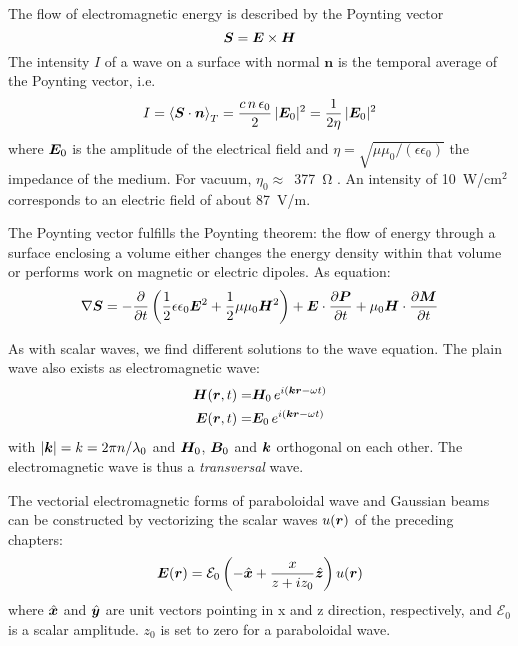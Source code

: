 The flow of electromagnetic energy is described by the Poynting vector
\begin{equation}
    \boldsymbol{S} = \boldsymbol{E} \times \boldsymbol{H}
\end{equation}
The intensity $I$ of a wave on a surface with normal $\boldsymbol{n}$ is the temporal average of the Poynting vector, i.e.
\begin{equation}
    I = \braket{\boldsymbol{S} \cdot \boldsymbol{n}}_T = \frac{c \, n \, \epsilon_0}{2} \, | \boldsymbol{E}_0 |^2 = \frac{1}{2 \eta } \, | \boldsymbol{E}_0 |^2
\end{equation}
where $\boldsymbol{E}_0 $ is the amplitude of the electrical field and $\eta = \sqrt{ \mu \mu_0 / (\epsilon \epsilon_0)}$ the impedance of the medium. For vacuum, $\eta_0 \approx$~\SI{377}{\ohm} . An intensity of 10~W/cm$^2$ corresponds to an electric field of about 87~V/m.

The Poynting vector fulfills the Poynting theorem: the flow of energy through a surface enclosing a volume either changes the energy density within that volume or performs work on magnetic or electric dipoles. As equation:
\begin{equation}
    \nabla \boldsymbol{S} = - \frac{\partial}{\partial t} \left( \frac{1}{2}  \epsilon \epsilon_0 \boldsymbol{E}^2 + \frac{1}{2} \mu \mu_0 \boldsymbol{H}^2  \right)
    + \boldsymbol{E} \cdot \frac{\partial \boldsymbol{P}}{\partial t} +   \mu_0 \boldsymbol{H} \cdot \frac{\partial \boldsymbol{M}}{\partial t}
\end{equation}


As with scalar waves, we find different solutions to the wave equation. The plain wave also exists as electromagnetic wave:
\begin{align}
    \boldsymbol{H}(\boldsymbol{r}, t) = & \boldsymbol{H}_0 \, e^{i (\boldsymbol{k} \boldsymbol{r} - \omega t)} \\
    \boldsymbol{E}(\boldsymbol{r}, t) = & \boldsymbol{E}_0 \, e^{i (\boldsymbol{k} \boldsymbol{r} - \omega t)} 
\end{align}
with $|\boldsymbol{k}| = k = 2 \pi n / \lambda_0$ and $\boldsymbol{H}_0$, $\boldsymbol{B}_0$ and $\boldsymbol{k}$  orthogonal on each other. The electromagnetic wave is thus a \emph{transversal} wave.

The vectorial electromagnetic forms of paraboloidal wave and Gaussian beams can be constructed by vectorizing the scalar waves $u(\boldsymbol{r})$ of the preceding chapters:
\begin{equation}
    \boldsymbol{E}(\boldsymbol{r}) = \mathcal{E}_0 \left( - \hat{\boldsymbol{x}} + \frac{x}{z + i z_0} \hat{\boldsymbol{z}} \right) u(\boldsymbol{r})
\end{equation}
where $\hat{\boldsymbol{x}}$ and $\hat{\boldsymbol{y}}$ are unit vectors pointing in x and z direction, respectively, and $\mathcal{E}_0 $ is a scalar amplitude. $z_0$ is set to zero for a paraboloidal wave.

